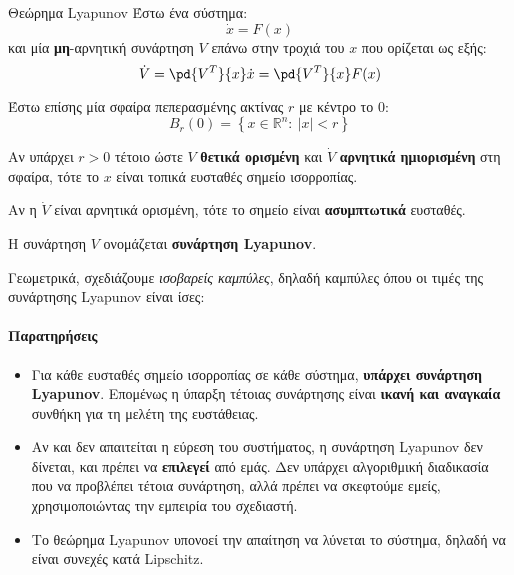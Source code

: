 \documentclass[11pt,a4paper,notitlepage,fleqn]{article}
\let\mytodo\todo
\renewcommand{\todo}[1]{\par\mytodo[inline,noline]{#1}}
\begin{document}
\begin{theorem}{Θεώρημα Lyapunov}{}
	Έστω ένα σύστημα: \[
	\dot x = F(x)
	\]
	και μία \textbf{μη}-αρνητική συνάρτηση \( V \) επάνω στην τροχιά του \( x \) που ορίζεται ως
	εξής:
	\[
	\dot V = \pd{V^T}{x} \dot x = \pd{V^T}{x} F(x)
	\]
	
	Έστω επίσης μία σφαίρα πεπερασμένης ακτίνας \( r \) με
	κέντρο το \(0\):
	\[
	B_r(0) = \left\lbrace x\in \mathbb R^n :\ |x|<r \right\rbrace
	\]
	
	Αν υπάρχει \( r > 0 \) τέτοιο ώστε \( V \) \textbf{θετικά ορισμένη}
	και \( \dot V \) \textbf{αρνητικά ημιορισμένη} στη σφαίρα, τότε το \( x \) είναι τοπικά
	ευσταθές σημείο ισορροπίας.
	
	Αν η \( \dot V \) είναι αρνητικά ορισμένη, τότε το σημείο είναι \textbf{ασυμπτωτικά} ευσταθές.
	
	Η συνάρτηση \( V \) ονομάζεται \textbf{συνάρτηση Lyapunov}.
\end{theorem}

Γεωμετρικά, σχεδιάζουμε \textit{ισοβαρείς καμπύλες}, δηλαδή καμπύλες όπου
οι τιμές της συνάρτησης Lyapunov είναι ίσες:
\todo{Graph 18}

\paragraph{Παρατηρήσεις}
\begin{itemize}
	\item Για κάθε ευσταθές σημείο ισορροπίας σε κάθε σύστημα, \textbf{υπάρχει
		συνάρτηση Lyapunov}. Επομένως η ύπαρξη τέτοιας συνάρτησης είναι
	\textbf{ικανή και αναγκαία} συνθήκη για τη μελέτη της ευστάθειας.
	\item Αν και δεν απαιτείται η εύρεση του συστήματος, η συνάρτηση
	Lyapunov δεν δίνεται, και πρέπει να \textbf{επιλεγεί} από εμάς. Δεν υπάρχει
	αλγοριθμική διαδικασία που να προβλέπει τέτοια συνάρτηση, αλλά πρέπει να
	σκεφτούμε εμείς, χρησιμοποιώντας την εμπειρία του σχεδιαστή.
	\item Το θεώρημα Lyapunov υπονοεί την απαίτηση να λύνεται
	το σύστημα, δηλαδή να είναι συνεχές κατά Lipschitz.
\end{itemize}

\end{document}
